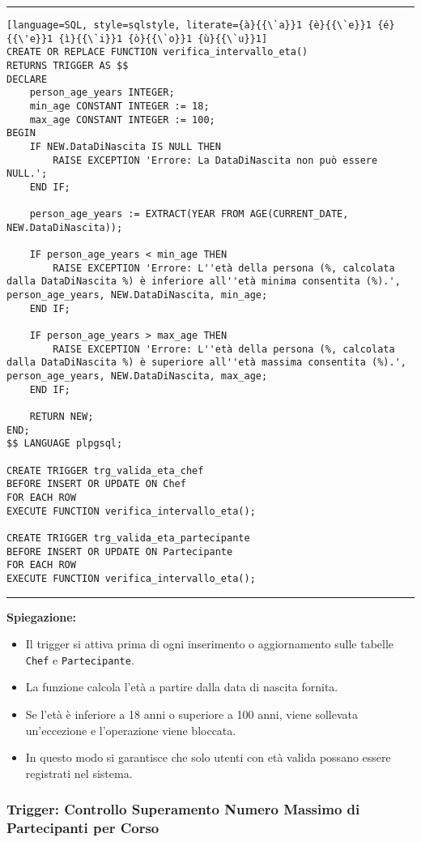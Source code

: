 \noindent\rule{\textwidth}{0.4pt}
\begin{lstlisting}[language=SQL, style=sqlstyle, literate={à}{{\`a}}1 {è}{{\`e}}1 {é}{{\'e}}1 {ì}{{\`i}}1 {ò}{{\`o}}1 {ù}{{\`u}}1]
CREATE OR REPLACE FUNCTION verifica_intervallo_eta()
RETURNS TRIGGER AS $$
DECLARE
    person_age_years INTEGER;
    min_age CONSTANT INTEGER := 18;
    max_age CONSTANT INTEGER := 100;
BEGIN
    IF NEW.DataDiNascita IS NULL THEN
        RAISE EXCEPTION 'Errore: La DataDiNascita non può essere NULL.';
    END IF;

    person_age_years := EXTRACT(YEAR FROM AGE(CURRENT_DATE, NEW.DataDiNascita));

    IF person_age_years < min_age THEN
        RAISE EXCEPTION 'Errore: L''età della persona (%, calcolata dalla DataDiNascita %) è inferiore all''età minima consentita (%).', person_age_years, NEW.DataDiNascita, min_age;
    END IF;

    IF person_age_years > max_age THEN
        RAISE EXCEPTION 'Errore: L''età della persona (%, calcolata dalla DataDiNascita %) è superiore all''età massima consentita (%).', person_age_years, NEW.DataDiNascita, max_age;
    END IF;

    RETURN NEW;
END;
$$ LANGUAGE plpgsql;

CREATE TRIGGER trg_valida_eta_chef
BEFORE INSERT OR UPDATE ON Chef
FOR EACH ROW
EXECUTE FUNCTION verifica_intervallo_eta();

CREATE TRIGGER trg_valida_eta_partecipante
BEFORE INSERT OR UPDATE ON Partecipante
FOR EACH ROW
EXECUTE FUNCTION verifica_intervallo_eta();
\end{lstlisting}
\noindent\rule{\textwidth}{0.4pt}

\textbf{Spiegazione:}
\begin{itemize}
    \item Il trigger si attiva prima di ogni inserimento o aggiornamento sulle tabelle \texttt{Chef} e \texttt{Partecipante}.
    \item La funzione calcola l'età a partire dalla data di nascita fornita.
    \item Se l'età è inferiore a 18 anni o superiore a 100 anni, viene sollevata un'eccezione e l'operazione viene bloccata.
    \item In questo modo si garantisce che solo utenti con età valida possano essere registrati nel sistema.
\end{itemize}

\subsubsection{Trigger: Controllo Superamento Numero Massimo di Partecipanti per Corso}

